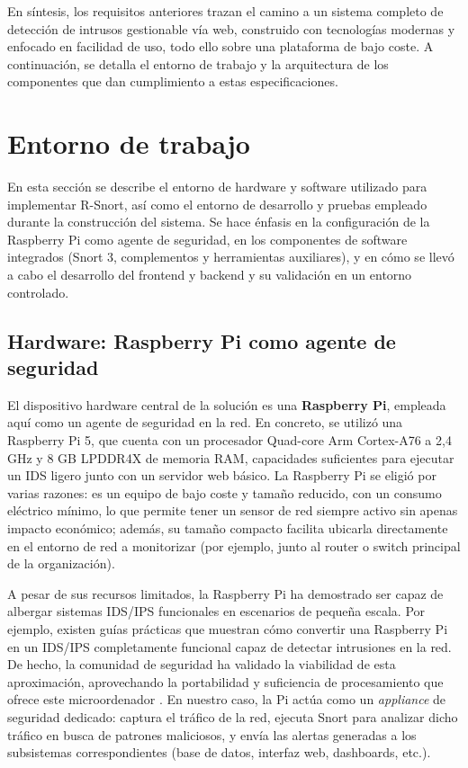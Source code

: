 \documentclass[11pt,a4paper,twoside]{report}
\begin{document}
En síntesis, los requisitos anteriores trazan el camino a un sistema completo de detección de intrusos gestionable vía web, construido con tecnologías modernas y enfocado en facilidad de uso, todo ello sobre una plataforma de bajo coste. A continuación, se detalla el entorno de trabajo y la arquitectura de los componentes que dan cumplimiento a estas especificaciones.

\section{Entorno de trabajo}
En esta sección se describe el entorno de hardware y software utilizado para implementar R-Snort, así como el entorno de desarrollo y pruebas empleado durante la construcción del sistema. Se hace énfasis en la configuración de la Raspberry Pi como agente de seguridad, en los componentes de software integrados (Snort 3, complementos y herramientas auxiliares), y en cómo se llevó a cabo el desarrollo del frontend y backend y su validación en un entorno controlado.

\subsection{Hardware: Raspberry Pi como agente de seguridad}
El dispositivo hardware central de la solución es una \textbf{Raspberry Pi}, empleada aquí como un agente de seguridad en la red. En concreto, se utilizó una Raspberry Pi 5, que cuenta con un procesador Quad-core Arm Cortex-A76 a 2,4 GHz y 8 GB LPDDR4X de memoria RAM, capacidades suficientes para ejecutar un IDS ligero junto con un servidor web básico. La Raspberry Pi se eligió por varias razones: es un equipo de bajo coste y tamaño reducido, con un consumo eléctrico mínimo, lo que permite tener un sensor de red siempre activo sin apenas impacto económico; además, su tamaño compacto facilita ubicarla directamente en el entorno de red a monitorizar (por ejemplo, junto al router o switch principal de la organización).\newline

A pesar de sus recursos limitados, la Raspberry Pi ha demostrado ser capaz de albergar sistemas IDS/IPS funcionales en escenarios de pequeña escala. Por ejemplo, existen guías prácticas que muestran cómo convertir una Raspberry Pi en un IDS/IPS completamente funcional capaz de detectar intrusiones en la red. De hecho, la comunidad de seguridad ha validado la viabilidad de esta aproximación, aprovechando la portabilidad y suficiencia de procesamiento que ofrece este microordenador \cite{SecMaster2024}. En nuestro caso, la Pi actúa como un \emph{appliance} de seguridad dedicado: captura el tráfico de la red, ejecuta Snort para analizar dicho tráfico en busca de patrones maliciosos, y envía las alertas generadas a los subsistemas correspondientes (base de datos, interfaz web, dashboards, etc.).\newline
\end{document}
